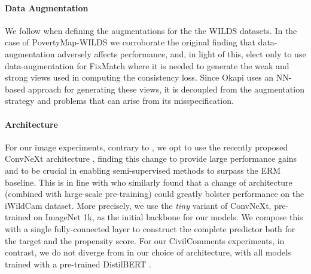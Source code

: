 \paragraph{Data Augmentation} We follow \cite{SagWeiLeeGaoetal22} when defining the augmentations
for the the WILDS datasets.
%
In the case of PovertyMap-WILDS we corroborate the original finding that data-augmentation
adversely affects performance, and, in light of this, elect only to use data-augmentation for
FixMatch where it is needed to generate the weak and strong views used in computing the consistency
loss.
%
Since Okapi uses an NN-based approach for generating these views, it is decoupled from the
augmentation strategy and problems that can arise from its misspecification.

\paragraph{Architecture} For our image experiments, contrary to \cite{SagWeiLeeGaoetal22}, we
opt to use the recently proposed ConvNeXt architecture \citep{liu2022convnet}, finding this change
to provide large performance gains and to be crucial in enabling semi-supervised methods to surpass
the ERM baseline.
%
This is in line with \cite{kim2022broad} who similarly found that a change of architecture
(combined with large-scale pre-training) could greatly bolster performance on the iWildCam dataset.
%
More precisely, we use the \emph{tiny} variant of ConvNeXt, pre-trained on ImageNet 1k, as the
initial backbone for our models. We compose this with a single fully-connected layer to construct
the complete predictor both for the target and the propensity score. For our CivilComments
experiments, in contrast, we do not diverge from \cite{SagWeiLeeGaoetal22} in our choice of
architecture, with all models trained with a pre-trained DistilBERT \citep{sanh2019distilbert}.

